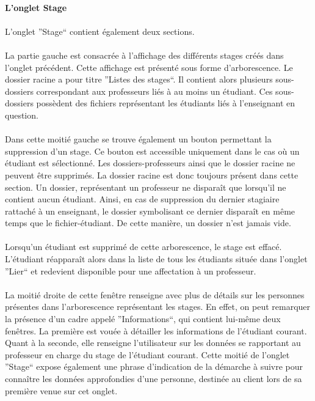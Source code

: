 \documentclass[a4paper,10pt]{report}
\begin{document}
	  \paragraph{L'onglet Stage}
	      \paragraph{}
		L'onglet ''Stage`` contient également deux sections.
		
	      \paragraph{}
		La partie gauche est consacrée à l'affichage des différents stages créés dans l'onglet précédent.
		Cette affichage est présenté sous forme d'arborescence.
		Le dossier racine a pour titre ''Listes des stages``.
		Il contient alors plusieurs sous-dossiers correspondant aux professeurs liés à au moins un étudiant.
		Ces sous-dossiers possèdent des fichiers représentant les étudiants liés à l'enseignant en question.
		
	      \paragraph{}
		Dans cette moitié gauche se trouve également un bouton permettant la suppression d'un stage.
		Ce bouton est accessible uniquement dans le cas où un étudiant est sélectionné.
		Les dossiers-professeurs ainsi que le dossier racine ne peuvent être supprimés.
		La dossier racine est donc toujours présent dans cette section.
		Un dossier, représentant un professeur ne disparaît que lorsqu'il ne contient aucun étudiant.
		Ainsi, en cas de suppression du dernier stagiaire rattaché à un enseignant, le dossier symbolisant ce dernier disparaît en même temps que le fichier-étudiant.
		De cette manière, un dossier n'est jamais vide.
		
	      \paragraph{}
		Lorsqu'un étudiant est supprimé de cette arborescence, le stage est effacé.
		L'étudiant réapparaît alors dans la liste de tous les étudiants située dans l'onglet ''Lier`` et redevient disponible pour une affectation à un professeur.
		
	      \paragraph{}
		La moitié droite de cette fenêtre renseigne avec plus de détails sur les personnes présentes dans l'arborescence représentant les stages.
		En effet, on peut remarquer la présence d'un cadre appelé ''Informations``, qui contient lui-même deux fenêtres.
		La première est vouée à détailler les informations de l'étudiant courant. 
		Quant à la seconde, elle renseigne l'utilisateur sur les données se rapportant au professeur en charge du stage de l'étudiant courant. 
		Cette moitié de l'onglet ''Stage`` expose également une phrase d'indication de la démarche à suivre pour connaître les données approfondies d'une personne, destinée au client lors de sa première venue sur cet onglet.
		
\end{document}
